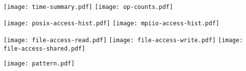 \documentclass[11pt,letterpaper,twocolumn]{article}
\begin{document}
\selectfont

\pagestyle{fancy}

\begin{figure*}[!h]
\centering
\subfigure
{
    
}\\
\subfigure
{
    \texttt{[image: time-summary.pdf]}
}
\subfigure
{
    \texttt{[image: op-counts.pdf]}
}
\end{figure*}

\begin{figure*}[!h]
\centering
\subfigure
{
    \texttt{[image: posix-access-hist.pdf]}
}
\ifdefined\inclmpiio
\subfigure
{
    \texttt{[image: mpiio-access-hist.pdf]}
}
\fi
\end{figure*}

\begin{figure*}[!h]
\centering
\subfigure
{
    
}
%    
\end{figure*}

\begin{figure*}[!h]
\centering
\subfigure
{
    \texttt{[image: file-access-read.pdf]}
}
\subfigure
{
    \texttt{[image: file-access-write.pdf]}
}
\subfigure
{
    \texttt{[image: file-access-shared.pdf]}
}
\subfigure
{
    
}
\subfigure
{
    
}
\end{figure*}

\begin{figure*}[!h]
\centering
\subfigure
{
    \texttt{[image: pattern.pdf]}
}
\subfigure
{
    
}
\end{figure*}
\end{document}
